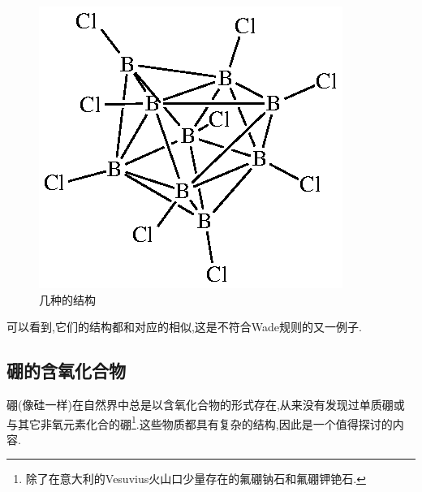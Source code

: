\documentclass{ctexart}
\begin{document}
\begin{figure}[H]
{\begin{minipage}[b]{.3\linewidth}
            \centering\includegraphics{picture/B9Cl9.eps}
        \end{minipage}
    }\caption{几种的结构}
\end{figure}
可以看到,它们的结构都和对应的相似,这是不符合Wade规则的又一例子.
\subsection{硼的含氧化合物}
硼(像硅一样)在自然界中总是以含氧化合物的形式存在,从来没有发现过单质硼或与其它非氧元素化合的硼\footnote{除了在意大利的Vesuvius火山口少量存在的氟硼钠石和氟硼钾铯石.}.这些物质都具有复杂的结构,因此是一个值得探讨的内容.
\end{document}
